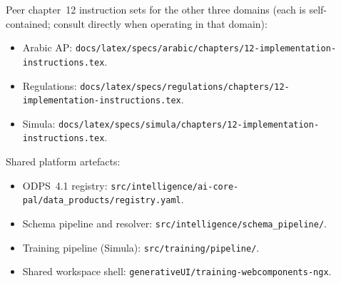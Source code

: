 Peer chapter~12 instruction sets for the other three domains (each
is self-contained; consult directly when operating in that domain):
\begin{itemize}
  \item Arabic AP:
    \texttt{docs/latex/specs/arabic/chapters/12-implementation-instructions.tex}.
  \item Regulations:
    \texttt{docs/latex/specs/regulations/chapters/12-implementation-instructions.tex}.
  \item Simula:
    \texttt{docs/latex/specs/simula/chapters/12-implementation-instructions.tex}.
\end{itemize}

Shared platform artefacts:
\begin{itemize}
  \item ODPS~4.1 registry:
    \texttt{src/intelligence/ai-core-pal/data\_products/registry.yaml}.
  \item Schema pipeline and resolver:
    \texttt{src/intelligence/schema\_pipeline/}.
  \item Training pipeline (Simula):
    \texttt{src/training/pipeline/}.
  \item Shared workspace shell:
    \texttt{generativeUI/training-webcomponents-ngx}.
\end{itemize}
